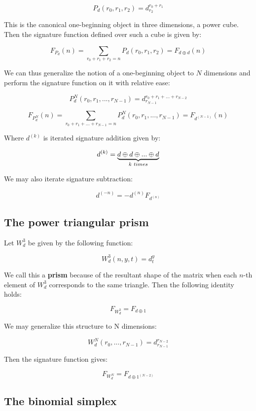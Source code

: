 \documentclass{article}
\begin{document}
$$P_d (r_0, r_1, r_2) = d_{r_2}^{r_0 + r_1}$$

\noindent This is the canonical one-beginning object in three dimensions, a power cube. Then the signature function defined over such a cube is given by:

$$F_{P_d} (n) = \sum_{r_0 + r_1 + r_2 = n} P_d(r_0, r_1, r_2) = F_{d \oplus d}(n)$$

\noindent We can thus generalize the notion of a one-beginning object to $N$ dimensions and perform the signature function on it with relative ease:

$$P_d^N (r_0, r_1, ..., r_{N-1}) = d_{r_{N-1}}^{r_0 + r_1 + ... + r_{N-2}}$$

$$F_{P_d^N} (n) = \sum_{r_0 + r_1 + ... + r_{N-1} = n} P_d^N(r_0, r_1, ..., r_{N-1}) = F_{d^{(N-1)}}(n)$$

\noindent Where $d^{(k)}$ is iterated signature addition given by:

$$d^{(k)} = \underbrace{d \oplus d \oplus ... \oplus d}_{k \hspace{1mm} times}$$

\noindent We may also iterate signature subtraction:

$$d^{(-n)} = -d^{(n)}F_{d^{(n)}}$$

\subsection{The power triangular prism}

\noindent Let $W_d^3$ be given by the following function:

$$W_d^3(n, y, t) = d_t^y$$

\noindent We call this a \textbf{prism} because of the resultant shape of the matrix when each $n$-th element of $W_d^3$ corresponds to the same triangle. Then the following identity holds:

$$F_{W_d^3} = F_{d \oplus 1}$$

\noindent We may generalize this structure to N dimensions:

$$W_d^N (r_0, ..., r_{N-1}) = d_{r_{N-1}}^{r_{N-2}}$$

\noindent Then the signature function gives:

$$F_{W_d^N} = F_{d \oplus 1^{(N-2)}}$$

\pagebreak
\subsection{The binomial simplex}
\end{document}
